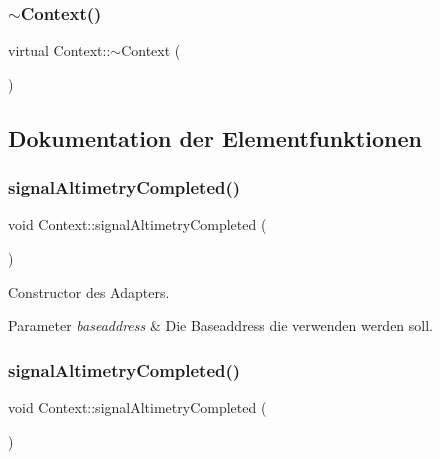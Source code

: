 \subsubsection{\texorpdfstring{$\sim$\+Context()}{~Context()}\hspace{0.1cm}{\footnotesize\ttfamily [2/2]}}
{\footnotesize\ttfamily virtual Context\+::$\sim$\+Context (\begin{DoxyParamCaption}{ }\end{DoxyParamCaption})\hspace{0.3cm}{\ttfamily [virtual]}}



\subsection{Dokumentation der Elementfunktionen}
\hypertarget{class_context_a01e833c79e6ca0d21b419b3f6af9bbdc}{}\label{class_context_a01e833c79e6ca0d21b419b3f6af9bbdc} 
\subsubsection{\texorpdfstring{signal\+Altimetry\+Completed()}{signalAltimetryCompleted()}\hspace{0.1cm}{\footnotesize\ttfamily [1/2]}}
{\footnotesize\ttfamily void Context\+::signal\+Altimetry\+Completed (\begin{DoxyParamCaption}{ }\end{DoxyParamCaption})}

Constructor des Adapters.


\begin{DoxyParams}{Parameter}
{\em baseaddress} & Die Baseaddress die verwenden werden soll. \\
\hline
\end{DoxyParams}
\hypertarget{class_context_a01e833c79e6ca0d21b419b3f6af9bbdc}{}\label{class_context_a01e833c79e6ca0d21b419b3f6af9bbdc} 
\subsubsection{\texorpdfstring{signal\+Altimetry\+Completed()}{signalAltimetryCompleted()}\hspace{0.1cm}{\footnotesize\ttfamily [2/2]}}
{\footnotesize\ttfamily void Context\+::signal\+Altimetry\+Completed (\begin{DoxyParamCaption}{ }\end{DoxyParamCaption})}


